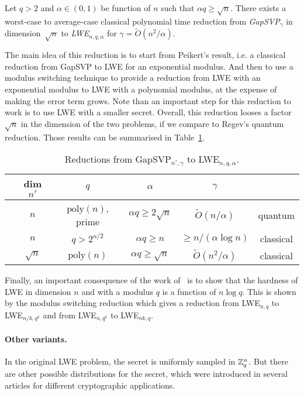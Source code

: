 \begin{theorem}
Let $q >2$ and $\alpha \in (0,1)$ be function of $n$ such that $\alpha q \geq \sqrt{n}$. There exists a worst-case to average-case classical polynomial time reduction from \emph{GapSVP}$_{\gamma}$ in dimension~$\sqrt{n}$ to \emph{LWE}$_{n,q,\alpha}$ for $\gamma = \tilde{O}(n^2/\alpha)$. 
\end{theorem}

The main idea of this reduction is to start from Peikert's result, i.e. a classical reduction from GapSVP to LWE for an exponential modulus. And then to use a modulus switching technique to provide a reduction from LWE with an exponential modulus to LWE with a polynomial modulus, at the expense of making the error term grows. 
 Note than an important step for this reduction to work is to use LWE with a smaller secret.
Overall, this reduction looses a factor $\sqrt{n}$ in the dimension of the two problems, if we compare to Regev's quantum reduction.
Those results can be summarised in Table~\ref{tab:LWE}.

\begin{table}[h]
\begin{center}
\begin{tabular}{c|c|c|c|c|c}
& dim $n'$ & $q$ & $\alpha$ & $\gamma$ & \\
\hline
\cite{Reg05} & $n$ & $\text{poly}(n)$, prime  & $\alpha q \geq 2\sqrt{n}$& $\tilde{O}(n/\alpha)$ & quantum \\[0.3em]
\cite{Pei09} & $n$ & $q> 2^{n/2}$ & $\alpha q \geq n$ & $ \geq n /(\alpha \log n)$ & classical \\[0.3em]
\cite{BLPRS13} & $\sqrt{n}$ & $\text{poly}(n)$ & $\alpha q \geq \sqrt{n}$ & $\tilde{O}(n^2/\alpha)$ & classical \\
\end{tabular}
\caption{Reductions from GapSVP$_{n', \gamma}$ to LWE$_{n,q,\alpha}$.}
\label{tab:LWE}
\end{center}
\end{table}

Finally, an important consequence of the work of~\cite{BLPRS13} is to show that the hardness of LWE in dimension $n$ and with a modulus $q$ is a function of $n \log q$. This is shown by the modulus switching reduction which gives a reduction from LWE$_{n,q}$ to LWE$_{n/k,q^k}$ and from LWE$_{n,q^k}$ to LWE$_{nk,q}$.





\paragraph{Other variants.}
In the original LWE problem, the secret is uniformly sampled in $\mathbb{Z}_q^n$. But there are other possible distributions for the secret, which were introduced in several articles for different cryptographic applications.

